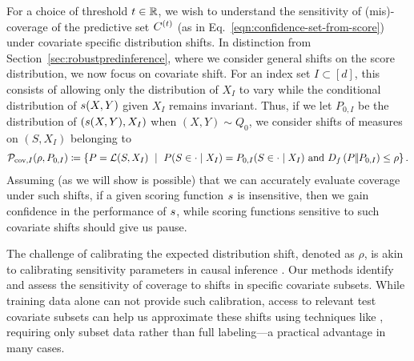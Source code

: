 For a choice of threshold $t \in \mathbb{R}$, we wish to understand the
sensitivity of (mis)-coverage of the predictive set $C^{(t)}$
(as in Eq.~\eqref{eqn:confidence-set-from-score}) under covariate specific
distribution shifts.  In distinction from
Section~\ref{sec:robustpredinference}, where we consider general shifts on
the score distribution, we now focus on covariate shift.
For an index set $I \subset [d]$,
this consists
of allowing only the distribution of $X_I$ to
vary while the conditional distribution of $s(X,Y)$ given $X_I$
remains invariant.  Thus, if we let $P_{0,I}$ be the distribution
of $(s(X,Y), X_I)$ when $(X,Y) \sim Q_0$, we consider shifts
of measures on $(S, X_I)$ belonging to
\begin{align*}
  \mathcal{P}_{\textup{cov},I}(\rho, P_{0,I}) \coloneqq \left\{ P
  = \mathcal{L}(S, X_I)
  ~ \mid ~
  P(S \in \cdot \mid X_I) = P_{0,I}(S \in \cdot \mid X_I) \text{ and } D_{f}\left({P} |\!| {P_{0,I}}\right) \le \rho \right\}.
\end{align*}
Assuming (as we will show is possible) that we can accurately
evaluate coverage under such shifts, if a given scoring function $s$ is
insensitive, then we gain confidence in the performance of $s$,
while scoring functions sensitive to such covariate shifts should give
us pause.

The challenge of calibrating the expected distribution shift, denoted as $\rho$, is akin to calibrating sensitivity parameters in causal inference \citep{HsuSm13,VeitchZa20}. Our methods identify and assess the sensitivity of coverage to shifts in specific covariate subsets. While training data alone can not provide such calibration, access to relevant test covariate subsets can help us approximate these shifts using techniques like \citep{NguyenWaJo10}, requiring only subset data rather than full labeling—a practical advantage in many cases.

